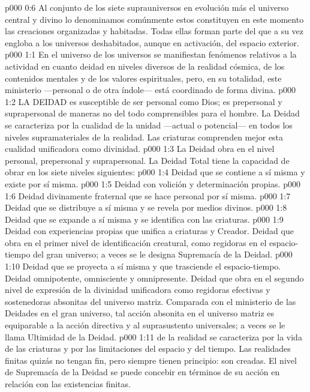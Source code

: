 \vs p000 0:6 Al conjunto de los siete suprauniversos en evolución más el universo central y divino lo denominamos comúnmente  estos constituyen en este momento las creaciones organizadas y habitadas. Todas ellas forman parte del  que a su vez engloba a los universos deshabitados, aunque en activación, del espacio exterior.
\vs p000 1:1 En el universo de los universos se manifiestan fenómenos relativos a la actividad en cuanto deidad en niveles diversos de la realidad cósmica, de los contenidos mentales y de los valores espirituales, pero, en su totalidad, este ministerio ---personal o de otra índole--- está coordinado de forma divina.
\vs p000 1:2 \pc LA DEIDAD es susceptible de ser personal como Dios; es prepersonal y suprapersonal de maneras no del todo comprensibles para el hombre. La Deidad se caracteriza por la cualidad de la unidad ---actual o potencial--- en todos los niveles supramateriales de la realidad. Las criaturas comprenden mejor esta cualidad unificadora como divinidad.
\vs p000 1:3 \pc La Deidad obra en el nivel personal, prepersonal y suprapersonal. La Deidad Total tiene la capacidad de obrar en los siete niveles siguientes:
\vs p000 1:4  Deidad que se contiene a sí misma y existe por sí misma.
\vs p000 1:5  Deidad con volición y determinación propias.
\vs p000 1:6  Deidad divinamente fraternal que se hace personal por sí misma.
\vs p000 1:7  Deidad que se distribuye a sí misma y se revela por medios divinos.
\vs p000 1:8  Deidad que se expande a sí misma y se identifica con las criaturas.
\vs p000 1:9  Deidad con experiencias propias que unifica a criaturas y Creador. Deidad que obra en el primer nivel de identificación creatural, como regidoras en el espacio\hyp{}tiempo del gran universo; a veces se le designa Supremacía de la Deidad.
\vs p000 1:10  Deidad que se proyecta a sí misma y que trasciende el espacio\hyp{}tiempo. Deidad omnipotente, omnisciente y omnipresente. Deidad que obra en el segundo nivel de expresión de la divinidad unificadora como regidoras efectivas y sostenedoras absonitas del universo matriz. Comparada con el ministerio de las Deidades en el gran universo, tal acción absonita en el universo matriz es equiparable a la acción directiva y al suprasustento universales; a veces se le llama Ultimidad de la Deidad.
\vs p000 1:11 \pc {} de la realidad se caracteriza por la vida de las criaturas y por las limitaciones del espacio y del tiempo. Las realidades finitas quizás no tengan fin, pero siempre tienen principio: son creadas. El nivel de Supremacía de la Deidad se puede concebir en términos de su acción en relación con las existencias finitas.
